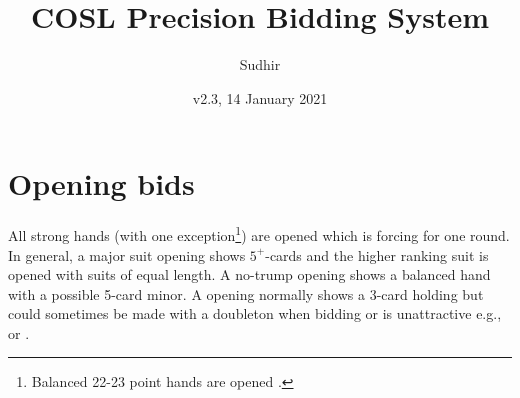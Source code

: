 \documentclass[a4paper,article,oneside]{memoir}
\begin{document}
\title{COSL Precision Bidding System}
\author{Sudhir}
\date{v2.3, 14 January 2021}
\maketitle

\tableofcontents

\pagebreak

\section{Opening bids}

All strong hands (with one exception\footnote{Balanced 22-23
  point hands are opened .}) are opened  which is forcing
for one round. In general, a major suit opening shows $5^+$-cards and
the higher ranking suit is opened with suits of equal length. A
no-trump opening shows a balanced hand with a possible 5-card minor. A
 opening normally shows a 3-card holding but could sometimes be
made with a doubleton when bidding  or  is unattractive
e.g.,  or .
\end{document}
